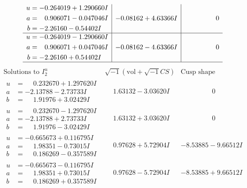 \documentclass[1p]{elsarticle_modified}
\theoremstyle{definition}
\newcommand{\I}{\sqrt{-1}}
\begin{document}
$$\begin{array}{c|c|c}
\begin{aligned}
u &= -0.264019 + 1.290660 I \\
a &= \phantom{-}0.906071 - 0.047046 I \\
b &= -2.26160 - 0.54402 I\end{aligned}
 & -0.08162 + 4.63366 I & \phantom{-0.000000 } 0 \\ \hline\begin{aligned}
u &= -0.264019 - 1.290660 I \\
a &= \phantom{-}0.906071 + 0.047046 I \\
b &= -2.26160 + 0.54402 I\end{aligned}
 & -0.08162 - 4.63366 I & \phantom{-0.000000 } 0\\
 \hline 
 \end{array}$$\newpage$$\begin{array}{c|c|c}  
\text{Solutions to }I^u_{2}& \I (\text{vol} + \sqrt{-1}CS) & \text{Cusp shape}\\
 \hline 
\begin{aligned}
u &= \phantom{-}0.232670 + 1.297620 I \\
a &= -2.13788 - 2.73733 I \\
b &= \phantom{-}1.91976 + 3.02429 I\end{aligned}
 & \phantom{-}1.63132 - 3.03620 I & \phantom{-0.000000 } 0 \\ \hline\begin{aligned}
u &= \phantom{-}0.232670 - 1.297620 I \\
a &= -2.13788 + 2.73733 I \\
b &= \phantom{-}1.91976 - 3.02429 I\end{aligned}
 & \phantom{-}1.63132 + 3.03620 I & \phantom{-0.000000 } 0 \\ \hline\begin{aligned}
u &= -0.665673 + 0.116795 I \\
a &= \phantom{-}1.98351 - 0.73015 I \\
b &= \phantom{-}0.186269 - 0.357589 I\end{aligned}
 & \phantom{-}0.97628 + 5.72904 I & -8.53885 - 9.66512 I \\ \hline\begin{aligned}
u &= -0.665673 - 0.116795 I \\
a &= \phantom{-}1.98351 + 0.73015 I \\
b &= \phantom{-}0.186269 + 0.357589 I\end{aligned}
 & \phantom{-}0.97628 - 5.72904 I & -8.53885 + 9.66512 I \\ \hline\begin{aligned}

\end{aligned}
\end{array}$$
\end{document}
